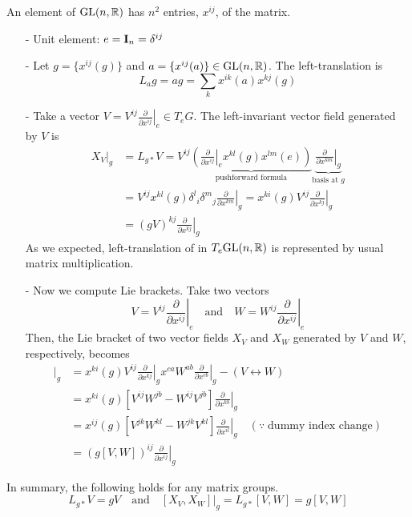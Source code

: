 \documentclass[a4paper, 10pt]{article}
\begin{document}
\begin{example}
    An element of $\mathrm{GL}(n,\mathbb{R})$ has $n^{2}$ entries, $x^{ij}$, of the matrix.
    \begin{itemize}
        \item[-] Unit element: $e = \mathbf{I}_{n} = \delta^{ij}$
        \item[-] Let $g = \{x^{ij}(g)\}$ and $a = \{x^{ij}(a)\} \in \mathrm{GL}(n,\mathbb{R})$. The left-translation is
        \[ L_{a}g = ag = \sum_{k} x^{ik}(a)x^{kj}(g) \]
        \item[-] Take a vector $\displaystyle{V = V^{ij} \left.\frac{\partial}{\partial x^{ij}}\right|_{e} \in T_{e}G}$. The left-invariant vector field generated by $V$ is
        \begin{align*}
            X_{V}|_{g} &= L_{g\ast}V = V^{ij}\underbrace{\left(\left.\frac{\partial}{\partial x^{ij}}\right|_{e}x^{kl}(g)x^{lm}(e)\right)}_{\text{pushforward formula}} \underbrace{\left.\frac{\partial}{\partial x^{km}}\right|_{g}}_{\text{basis at }g} \\
            &= V^{ij}x^{kl}(g)\delta^{l}{}_{i}\delta^{m}{}_{j}\left.\frac{\partial}{\partial x^{km}}\right|_{g} = x^{ki}(g)V^{ij}\left.\frac{\partial}{\partial x^{kj}}\right|_{g} \\
            &= \boxed{(gV)^{kj}\left.\frac{\partial}{\partial x^{kj}}\right|_{g}}
        \end{align*}
        As we expected, left-translation of  in $T_{e}\mathrm{GL}(n,\mathbb{R})$ is represented by usual matrix multiplication.
        \item[-] Now we compute Lie brackets. Take two vectors
        \[ V = V^{ij} \left.\frac{\partial}{\partial x^{ij}}\right|_{e} \quad\text{and}\quad W = W^{ij} \left.\frac{\partial}{\partial x^{ij}}\right|_{e} \]
        Then, the Lie bracket of two vector fields $X_{V}$ and $X_{W}$ generated by $V$ and $W$, respectively, becomes
        \begin{align*}
            [X_{V}, X_{W}]|_{g} &= x^{ki}(g)V^{ij}\left.\frac{\partial}{\partial x^{kj}}\right|_{g} x^{ca}W^{ab}\left.\frac{\partial}{\partial x^{cb}}\right|_{g} - (V \leftrightarrow W) \\
            &= x^{ki}(g)[V^{ij}W^{jb}-W^{ij}V^{jb}]\left.\frac{\partial}{\partial x^{kb}}\right|_{g} \\
            &= x^{ij}(g)[V^{jk}W^{kl}-W^{jk}V^{kl}]\left.\frac{\partial}{\partial x^{il}}\right|_{g} \quad(\because \;\text{dummy index change}) \\
            &= (g[V,W])^{ij}\left.\frac{\partial}{\partial x^{ij}}\right|_{g}
        \end{align*}
    \end{itemize}
    In summary, the following holds for any matrix groups.
    \[ \boxed{L_{g\ast}V = gV} \quad\text{and}\quad \boxed{[X_{V},X_{W}]|_{g} = L_{g\ast}[V,W] = g[V,W]} \]
\end{example}
\end{document}
